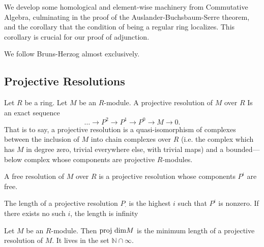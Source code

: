 We develop some 
homological and element-wise machinery
from Commutative Algebra, culminating 
in the proof of the Auslander-Buchsbaum-Serre 
theorem, and 
the corollary that the condition of being 
a regular ring localizes. 
This corollary is crucial for our proof of adjunction.

We follow Bruns-Herzog almost exclusively.



\subsection{Projective Resolutions}

\begin{definition}
  \label{def:projv_resl}
  Let $R$ be a ring. 
  Let $M$ be an $R$-module.
  A projective resolution of $M$ over $R$
  Is an exact sequence
  \[
    \ldots \to P^2 \to P^1 \to P^0 \to M \to 0
  .\]
  That is to say, a projective resolution is a
  quasi-isomorphism of complexes between the 
  inclusion of $M$ into chain complexes over $R$
  (i.e. the complex which has $M$ in degree zero,
  trivial everywhere else, with trivial maps)
  and a bounded—below complex whose
  components are projective $R$-modules.
\end{definition}

\begin{definition}
  \label{def:free_resl}
  A free resolution of $M$ over $R$ is 
  a projective resolution whose components
  $P^i$ are free.
\end{definition}

\begin{definition}
  \label{def:length_of_resl}
  The length of a projective
  resolution $P_\cdot$ is 
  the highest $i$ such that $P^i$
  is nonzero.
  If there exists no such $i$, the
  length is infinity
\end{definition}

\begin{definition}
  \label{def:projdim}
  Let $M$ be an $R$-module. 
  Then $\text{proj dim} M$ is the minimum 
  length of a projective resolution of $M$.
  It lives in the set $\mathbb{N} \cap \infty$.
\end{definition}

